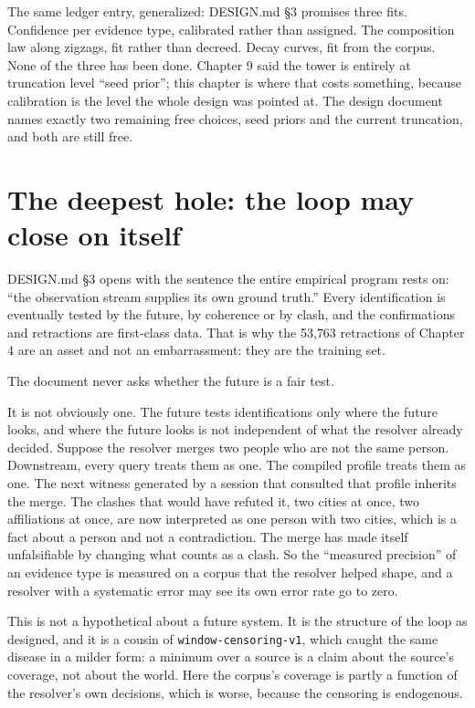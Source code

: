 The same ledger entry, generalized: \textsf{DESIGN.md} \S3 promises three fits. Confidence per evidence type, calibrated rather than assigned. The composition law along zigzags, fit rather than decreed. Decay curves, fit from the corpus. None of the three has been done. Chapter 9 said the tower is entirely at truncation level ``seed prior''; this chapter is where that costs something, because calibration is the level the whole design was pointed at. The design document names exactly two remaining free choices, seed priors and the current truncation, and both are still free.

\section{The deepest hole: the loop may close on itself}

\textsf{DESIGN.md} \S3 opens with the sentence the entire empirical program rests on: ``the observation stream supplies its own ground truth.'' Every identification is eventually tested by the future, by coherence or by clash, and the confirmations and retractions are first-class data. That is why the 53{,}763 retractions of Chapter 4 are an asset and not an embarrassment: they are the training set.

The document never asks whether the future is a fair test.

It is not obviously one. The future tests identifications only where the future looks, and where the future looks is not independent of what the resolver already decided. Suppose the resolver merges two people who are not the same person. Downstream, every query treats them as one. The compiled profile treats them as one. The next witness generated by a session that consulted that profile inherits the merge. The clashes that would have refuted it, two cities at once, two affiliations at once, are now interpreted as one person with two cities, which is a fact about a person and not a contradiction. The merge has made itself unfalsifiable by changing what counts as a clash. So the ``measured precision'' of an evidence type is measured on a corpus that the resolver helped shape, and a resolver with a systematic error may see its own error rate go to zero.

This is not a hypothetical about a future system. It is the structure of the loop as designed, and it is a cousin of \texttt{window-censoring-v1}, which caught the same disease in a milder form: a minimum over a source is a claim about the source's coverage, not about the world. Here the corpus's coverage is partly a function of the resolver's own decisions, which is worse, because the censoring is endogenous.

